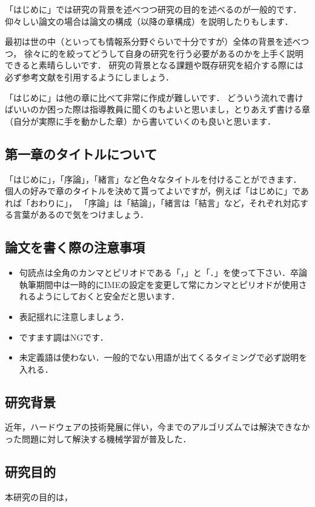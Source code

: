 「はじめに」では研究の背景を述べつつ研究の目的を述べるのが一般的です．
仰々しい論文の場合は論文の構成（以降の章構成）を説明したりもします．

最初は世の中（といっても情報系分野ぐらいで十分ですが）全体の背景を述べつつ，
徐々に的を絞ってどうして自身の研究を行う必要があるのかを上手く説明できると素晴らしいです．
研究の背景となる課題や既存研究を紹介する際には必ず参考文献を引用するようにしましょう．

「はじめに」は他の章に比べて非常に作成が難しいです．
どういう流れで書けばいいのか困った際は指導教員に聞くのもよいと思いまし，とりあえず書ける章（自分が実際に手を動かした章）から書いていくのも良いと思います．

\subsection{第一章のタイトルについて}
「はじめに」，「序論」，「緒言」など色々なタイトルを付けることができます．
個人の好みで章のタイトルを決めて貰ってよいですが，例えば「はじめに」であれば「おわりに」，
「序論」は「結論」，「緒言は「結言」など，それぞれ対応する言葉があるので気をつけましょう．

\subsection{論文を書く際の注意事項}
\begin{itemize}
    \item 句読点は全角のカンマとピリオドである「，」と「．」を使って下さい．卒論執筆期間中は一時的にIMEの設定を変更して常にカンマとピリオドが使用されるようにしておくと安全だと思います．
    \item 表記揺れに注意しましょう．
    \item ですます調はNGです．
    \item 未定義語は使わない．一般的でない用語が出てくるタイミングで必ず説明を入れる．
\end{itemize}

\subsection{研究背景}
近年，ハードウェアの技術発展に伴い，今までのアルゴリズムでは解決できなかった問題に対して解決する機械学習が普及した．

\subsection{研究目的}
本研究の目的は，